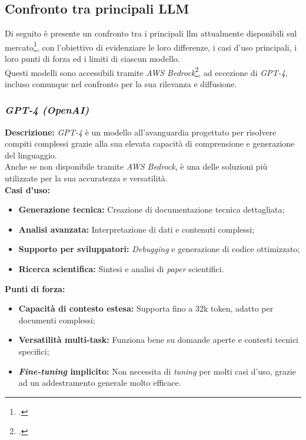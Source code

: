 \subsection{Confronto tra principali LLM}
\label{subsec:llm-confronto}

Di seguito è presente un confronto tra i principali \gls{llm} attualmente disponibili sul mercato\footcite{site:key-differences-llm}, con l'obiettivo di evidenziare le loro differenze, i casi d'uso principali, i loro punti di forza ed i limiti di ciascun modello.\\
Questi modelli sono accessibili tramite \textit{AWS Bedrock}\footcite{site:aws-bedrock}, ad eccezione di \textit{GPT-4}, incluso comunque nel confronto per la sua rilevanza e diffusione.

\subsubsection{\textit{GPT-4 (OpenAI)}}

\noindent \textbf{Descrizione:}
\textit{GPT-4} è un modello all’avanguardia progettato per risolvere compiti complessi grazie alla sua elevata capacità di comprensione e generazione del linguaggio. \\
Anche se non disponibile tramite \textit{AWS Bedrock}, è una delle soluzioni più utilizzate per la sua accuratezza e versatilità.\\

\noindent \textbf{Casi d’uso:}
\begin{itemize}
   \item \textbf{Generazione tecnica:} Creazione di documentazione tecnica dettagliata;
   \item \textbf{Analisi avanzata:} Interpretazione di dati e contenuti complessi;
   \item \textbf{Supporto per sviluppatori:} \textit{Debugging} e generazione di codice ottimizzato;
   \item \textbf{Ricerca scientifica:} Sintesi e analisi di \textit{paper} scientifici.
\end{itemize}

\noindent \textbf{Punti di forza:}
\begin{itemize}
    \item \textbf{Capacità di contesto estesa:} Supporta fino a 32k \gls{token}, adatto per documenti complessi;
    \item \textbf{Versatilità multi-task:} Funziona bene su domande aperte e contesti tecnici specifici;
    \item \textbf{\textit{Fine-tuning} implicito:} Non necessita di \textit{tuning} per molti casi d’uso, grazie ad un addestramento generale molto efficace.
\end{itemize}

